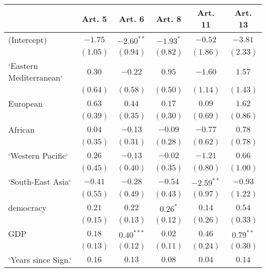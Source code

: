
\begin{table}[!h]
\begin{center}
\begin{tabular}{l c c c c c }
\toprule
 & Art. 5 & Art. 6 & Art. 8 & Art. 11 & Art. 13 \\
\midrule
(Intercept)             & $-1.75$      & $-2.60^{**}$ & $-1.93^{*}$  & $-0.52$      & $-3.81$      \\
                        & $(1.05)$     & $(0.94)$     & $(0.82)$     & $(1.86)$     & $(2.33)$     \\
`Eastern Mediterranean` & $0.30$       & $-0.22$      & $0.95$       & $-1.60$      & $1.57$       \\
                        & $(0.64)$     & $(0.58)$     & $(0.50)$     & $(1.14)$     & $(1.43)$     \\
European                & $0.63$       & $0.44$       & $0.17$       & $0.09$       & $1.62$       \\
                        & $(0.39)$     & $(0.35)$     & $(0.30)$     & $(0.69)$     & $(0.86)$     \\
African                 & $0.04$       & $-0.13$      & $-0.09$      & $-0.77$      & $0.78$       \\
                        & $(0.35)$     & $(0.31)$     & $(0.28)$     & $(0.62)$     & $(0.78)$     \\
`Western Pacific`       & $0.26$       & $-0.13$      & $-0.02$      & $-1.21$      & $0.66$       \\
                        & $(0.45)$     & $(0.40)$     & $(0.35)$     & $(0.80)$     & $(1.00)$     \\
`South-East Asia`       & $-0.41$      & $-0.28$      & $-0.54$      & $-2.59^{**}$ & $-0.93$      \\
                        & $(0.55)$     & $(0.49)$     & $(0.43)$     & $(0.97)$     & $(1.22)$     \\
democracy               & $0.21$       & $0.22$       & $0.26^{*}$   & $0.14$       & $0.54$       \\
                        & $(0.15)$     & $(0.13)$     & $(0.12)$     & $(0.26)$     & $(0.33)$     \\
GDP                     & $0.18$       & $0.40^{***}$ & $0.02$       & $0.46$       & $0.79^{**}$  \\
                        & $(0.13)$     & $(0.12)$     & $(0.11)$     & $(0.24)$     & $(0.30)$     \\
`Years since Sign.`     & $0.16$       & $0.13$       & $0.08$       & $0.04$       & $0.14$       \\

\end{tabular}
\end{center}
\end{table}
